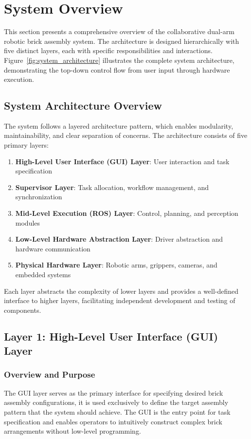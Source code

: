 \section{System Overview}
\label{sec:system_overview}

This section presents a comprehensive overview of the collaborative dual-arm robotic brick assembly system. The architecture is designed hierarchically with five distinct layers, each with specific responsibilities and interactions. Figure~\ref{fig:system_architecture} illustrates the complete system architecture, demonstrating the top-down control flow from user input through hardware execution.

\subsection{System Architecture Overview}
\label{subsec:architecture_overview}

The system follows a layered architecture pattern, which enables modularity, maintainability, and clear separation of concerns. The architecture consists of five primary layers:

\begin{enumerate}
    \item \textbf{High-Level User Interface (GUI) Layer}: User interaction and task specification
    \item \textbf{Supervisor Layer}: Task allocation, workflow management, and synchronization
    \item \textbf{Mid-Level Execution (ROS) Layer}: Control, planning, and perception modules
    \item \textbf{Low-Level Hardware Abstraction Layer}: Driver abstraction and hardware communication
    \item \textbf{Physical Hardware Layer}: Robotic arms, grippers, cameras, and embedded systems
\end{enumerate}

Each layer abstracts the complexity of lower layers and provides a well-defined interface to higher layers, facilitating independent development and testing of components.

\subsection{Layer 1: High-Level User Interface (GUI) Layer}
\label{subsec:gui_layer}

\subsubsection{Overview and Purpose}
The GUI layer serves as the primary interface for specifying desired brick assembly configurations, it is used exclusively to define the target assembly pattern that the system should achieve. The GUI is the entry point for task specification and enables operators to intuitively construct complex brick arrangements without low-level programming.

